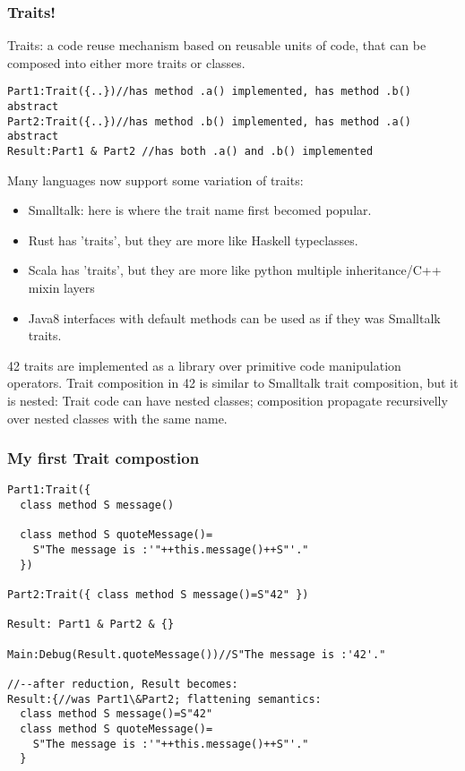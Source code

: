 \begin{frame}[fragile]
\frametitle{Traits!}
Traits: a code reuse mechanism based on reusable
units of code, that can be composed into either more traits or classes.

\begin{NiceCode}{59ex}{0.8}
\begin{lstlisting}
Part1:Trait({..})//has method .a() implemented, has method .b() abstract
Part2:Trait({..})//has method .b() implemented, has method .a() abstract
Result:Part1 & Part2 //has both .a() and .b() implemented
\end{lstlisting}
\end{NiceCode}

Many languages now support some variation of traits:
\begin{itemize}
\item Smalltalk: here is where the trait name first becomed popular.
\item Rust has 'traits', but they are more like Haskell typeclasses.
\item Scala has 'traits', but they are more like python multiple inheritance/C++ mixin layers
\item Java8 interfaces with default methods can be used as if they was Smalltalk traits.
\end{itemize}
42 traits are implemented as a library over primitive code manipulation operators.
Trait composition in 42 is similar to Smalltalk trait composition, but it is nested:
Trait code can have nested classes; composition propagate recursivelly over nested classes with the same name. 
\end{frame}



\begin{frame}[fragile]
\frametitle{My first Trait compostion}
\begin{NiceCode}{59ex}{0.8}
\begin{lstlisting}
Part1:Trait({
  class method S message()

  class method S quoteMessage()=
    S"The message is :'"++this.message()++S"'."
  })

Part2:Trait({ class method S message()=S"42" })

Result: Part1 & Part2 & {}

Main:Debug(Result.quoteMessage())//S"The message is :'42'."

//--after reduction, Result becomes:
Result:{//was Part1\&Part2; flattening semantics:
  class method S message()=S"42"
  class method S quoteMessage()=
    S"The message is :'"++this.message()++S"'."
  }
\end{lstlisting}
\end{NiceCode}
\end{frame}




